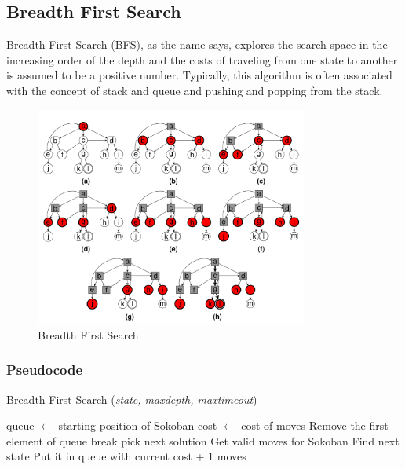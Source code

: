 \subsection{Breadth First Search}
\noindent Breadth First Search (BFS), as the name says, explores the search space in the increasing order of the depth and the costs of traveling from one state to another is assumed to be a positive number. Typically, this algorithm is often associated with the concept of stack and queue and pushing and popping from the stack.

\begin{figure}[H]
	\centering
	\includegraphics[width=0.8\textwidth]{./imgs/bfs.png}
	\caption{Breadth First Search}
\end{figure}

\subsubsection{Pseudocode}
\begin{algorithm}[H]
	\caption{Breadth First Search (\textit{state, maxdepth, maxtimeout})}
	\label{alg:bfs}
	\begin{algorithmic}[1]
	\State queue $\gets$ starting position of Sokoban
	\State cost $\gets$ cost of moves
		\State Remove the first element of queue
			\State break
		\Else
				\State pick next solution
			\Else
				\State Get valid moves for Sokoban
					\State Find next state
					\State Put it in queue with current cost + 1
				\EndFor
			\EndIf
		\EndIf
	\EndWhile
	\State \Return moves
	\end{algorithmic}
\end{algorithm}

